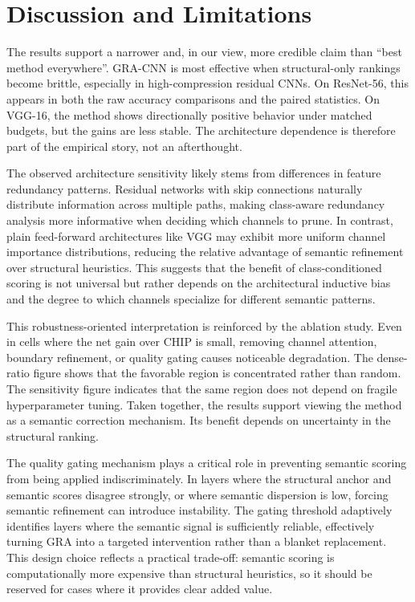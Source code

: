 \documentclass[preprint,12pt]{elsarticle}
\begin{document}
\section{Discussion and Limitations}
\label{sec:discussion}

The results support a narrower and, in our view, more credible claim than ``best method everywhere''. GRA-CNN is most effective when structural-only rankings become brittle, especially in high-compression residual CNNs. On ResNet-56, this appears in both the raw accuracy comparisons and the paired statistics. On VGG-16, the method shows directionally positive behavior under matched budgets, but the gains are less stable. The architecture dependence is therefore part of the empirical story, not an afterthought.

The observed architecture sensitivity likely stems from differences in feature redundancy patterns. Residual networks with skip connections naturally distribute information across multiple paths, making class-aware redundancy analysis more informative when deciding which channels to prune. In contrast, plain feed-forward architectures like VGG may exhibit more uniform channel importance distributions, reducing the relative advantage of semantic refinement over structural heuristics. This suggests that the benefit of class-conditioned scoring is not universal but rather depends on the architectural inductive bias and the degree to which channels specialize for different semantic patterns.

This robustness-oriented interpretation is reinforced by the ablation study. Even in cells where the net gain over CHIP is small, removing channel attention, boundary refinement, or quality gating causes noticeable degradation. The dense-ratio figure shows that the favorable region is concentrated rather than random. The sensitivity figure indicates that the same region does not depend on fragile hyperparameter tuning. Taken together, the results support viewing the method as a semantic correction mechanism. Its benefit depends on uncertainty in the structural ranking.

The quality gating mechanism plays a critical role in preventing semantic scoring from being applied indiscriminately. In layers where the structural anchor and semantic scores disagree strongly, or where semantic dispersion is low, forcing semantic refinement can introduce instability. The gating threshold adaptively identifies layers where the semantic signal is sufficiently reliable, effectively turning GRA into a targeted intervention rather than a blanket replacement. This design choice reflects a practical trade-off: semantic scoring is computationally more expensive than structural heuristics, so it should be reserved for cases where it provides clear added value.
\end{document}
